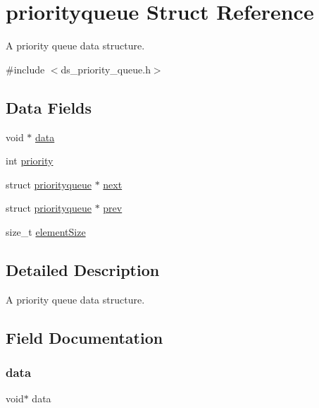 \hypertarget{structpriorityqueue}{}\section{priorityqueue Struct Reference}
\label{structpriorityqueue}


A priority queue data structure.  




{\ttfamily \#include $<$ds\+\_\+priority\+\_\+queue.\+h$>$}

\subsection*{Data Fields}
\begin{DoxyCompactItemize}
\item 
void $\ast$ \hyperlink{structpriorityqueue_a735984d41155bc1032e09bece8f8d66d}{data}
\item 
int \hyperlink{structpriorityqueue_acec9ce2df15222151ad66fcb1d74eb9f}{priority}
\item 
struct \hyperlink{structpriorityqueue}{priorityqueue} $\ast$ \hyperlink{structpriorityqueue_ad201c27ab3b5d056b515abec6484d679}{next}
\item 
struct \hyperlink{structpriorityqueue}{priorityqueue} $\ast$ \hyperlink{structpriorityqueue_a21f8d5cee7f9863e99c26f3a3120efb7}{prev}
\item 
size\+\_\+t \hyperlink{structpriorityqueue_af884332e6713af9425451adde09e0024}{element\+Size}
\end{DoxyCompactItemize}


\subsection{Detailed Description}
A priority queue data structure. 

\subsection{Field Documentation}
\mbox{\label{structpriorityqueue_a735984d41155bc1032e09bece8f8d66d}} 
\subsubsection{\texorpdfstring{data}{data}}
{\footnotesize\ttfamily void$\ast$ data}


